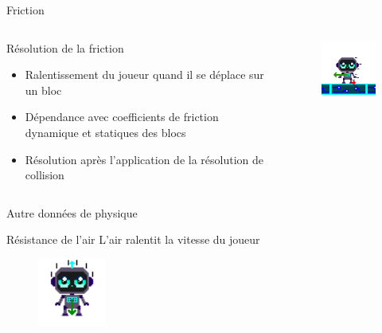 \documentclass{beamer}
\begin{document}
{\begin{frame}{Friction}
    \begin{columns}
        \begin{block}{Résolution de la friction}
            \begin{itemize}
                \item[\bullet] Ralentissement du joueur quand il se déplace sur un bloc
                \item[\bullet] Dépendance avec coefficients de friction dynamique et statiques des blocs
                \item[\bullet] Résolution après l'application de la résolution de collision
            \end{itemize}
        \end{block}
        \begin{figure}
            \centering
            \includegraphics[width=1.0\textwidth]{images/Friction.png}
        \end{figure}
    \end{columns}
\end{frame}

\begin{frame}{Autre données de physique}
    \begin{block}{Résistance de l'air}
        L'air ralentit la vitesse du joueur
        \begin{figure}
            \centering
            \includegraphics[width=0.2\textwidth]{images/Airresistance.png}
        \end{figure}
    \end{block}


\end{frame}}
\end{document}
